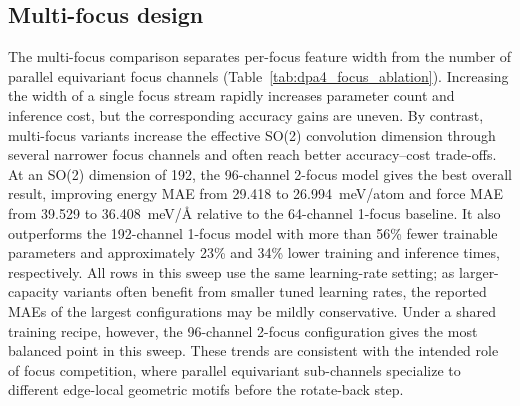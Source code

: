 \FloatBarrier
\subsection{Multi-focus design}
\label{sec:sm-multifocus}

The multi-focus comparison separates per-focus feature width from the number of parallel equivariant focus channels (Table~\ref{tab:dpa4_focus_ablation}).
Increasing the width of a single focus stream rapidly increases parameter count and inference cost, but the corresponding accuracy gains are uneven.
By contrast, multi-focus variants increase the effective SO(2) convolution dimension through several narrower focus channels and often reach better accuracy--cost trade-offs.
At an SO(2) dimension of 192, the 96-channel 2-focus model gives the best overall result, improving energy MAE from 29.418 to 26.994~meV/atom and force MAE from 39.529 to 36.408~meV/\AA{} relative to the 64-channel 1-focus baseline.
It also outperforms the 192-channel 1-focus model with more than 56\% fewer trainable parameters and approximately 23\% and 34\% lower training and inference times, respectively.
All rows in this sweep use the same learning-rate setting; as larger-capacity variants often benefit from smaller tuned learning rates, the reported MAEs of the largest configurations may be mildly conservative.
Under a shared training recipe, however, the 96-channel 2-focus configuration gives the most balanced point in this sweep.
These trends are consistent with the intended role of focus competition, where parallel equivariant sub-channels specialize to different edge-local geometric motifs before the rotate-back step.

